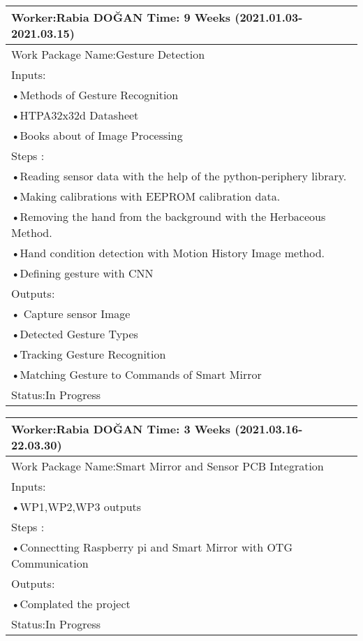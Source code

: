 	\FloatBarrier
	\begin{table}[h!]
		\begin{adjustbox}{width=\textwidth}
			\begin{tabular}{|l|}\hline
				Worker:Rabia DOĞAN   \tab[8cm] Time: 9 Weeks (2021.01.03-2021.03.15)\\\hline
				Work Package Name:Gesture Detection\\\hline
				Inputs:\\
				•Methods of Gesture Recognition\\
				•HTPA32x32d Datasheet\\
				•Books about of Image Processing\\\hline	
				Steps :\\
				•Reading sensor data with the help of the python-periphery library.\\
				•Making calibrations with EEPROM calibration data.\\
				•Removing the hand from the background with the Herbaceous Method.\\
				•Hand condition detection with Motion History Image method.\\
				•Defining gesture with CNN\\
				Outputs:\\
				• Capture sensor Image\\
				•Detected Gesture Types \\
				•Tracking Gesture Recognition \\
				•Matching Gesture to Commands of Smart Mirror\\\hline
				Status:In Progress\\\hline
			\end{tabular}
		\end{adjustbox}
	\end{table}
	\newpage
	\begin{table}[h!]
		\begin{adjustbox}{width=\textwidth}
			\begin{tabular}{|l|}\hline
				Worker:Rabia DOĞAN   \tab[8cm] Time: 3 Weeks (2021.03.16-22.03.30)\\\hline
				Work Package Name:Smart Mirror and Sensor PCB Integration\\\hline
				Inputs:\\
				•WP1,WP2,WP3 outputs \\\hline	
				Steps : \\
				•Connectting Raspberry pi and Smart Mirror with OTG Communication\\\hline
				Outputs:\\
				•Complated the project\\\hline
				Status:In Progress\\\hline
			\end{tabular}
		\end{adjustbox}
	\end{table}

